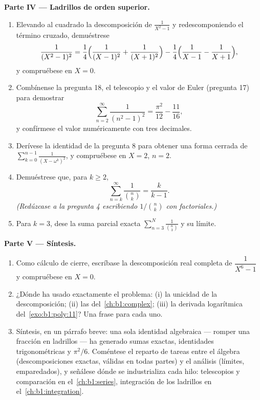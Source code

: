 \begin{problem}
\medskip
\noindent\textbf{Parte IV --- Ladrillos de orden superior.}
\begin{enumerate}[resume]
  \item Elevando al cuadrado la descomposición de $\frac1{X^2-1}$ y
        redescomponiendo el término cruzado, demuéstrese
        \[
        \frac1{(X^2-1)^2}
        = \frac14\Bigl(\frac1{(X-1)^2} + \frac1{(X+1)^2}\Bigr)
        - \frac14\Bigl(\frac1{X-1} - \frac1{X+1}\Bigr),
        \]
        y compruébese en $X = 0$.
  \item Combínense la pregunta 18, el telescopio y el valor de Euler
        (pregunta 17) para demostrar
        \[
        \sum_{n=2}^{\infty}\frac1{(n^2-1)^2}
        = \frac{\pi^2}{12} - \frac{11}{16} ,
        \]
        y confírmese el valor numéricamente con tres decimales.
  \item Derívese la identidad de la pregunta 8 para obtener una forma
        cerrada de $\sum_{k=0}^{n-1}\frac1{(X - \omega^k)^2}$, y
        compruébese en $X = 2$, $n = 2$.
  \item Demuéstrese que, para $k \geq 2$,
        \[
        \sum_{n=k}^{\infty}\frac{1}{\binom nk} = \frac{k}{k-1} .
        \]
        \emph{(Redúzcase a la pregunta 4 escribiendo $1/\binom nk$ con
        factoriales.)}
  \item Para $k = 3$, dese la suma parcial exacta
        $\sum_{n=3}^{N}\frac1{\binom n3}$ y su límite.
\end{enumerate}

\medskip
\noindent\textbf{Parte V --- Síntesis.}
\begin{enumerate}[resume]
  \item Como cálculo de cierre, escríbase la descomposición real
        completa de $\dfrac1{X^6 - 1}$ y compruébese en $X = 0$.
  \item ¿Dónde ha usado exactamente el problema: (i) la unicidad de la
        descomposición; (ii) las 
        del~\cref{ch:b1:complex}; (iii) la derivada logarítmica
        del~\cref{exo:b1:poly:11}? Una frase para cada uno.
  \item Síntesis, en un párrafo breve: una sola identidad algebraica
        --- romper una fracción en ladrillos --- ha generado sumas
        exactas, identidades trigonométricas y $\pi^2/6$. Coméntese el
        reparto de tareas entre el álgebra (descomposiciones exactas,
        válidas en todas partes) y el análisis (límites, emparedados),
        y señálese dónde se industrializa cada hilo: telescopios y
        comparación en el~\cref{ch:b1:series}, integración de los
        ladrillos en el~\cref{ch:b1:integration}.
\end{enumerate}
\end{problem}
